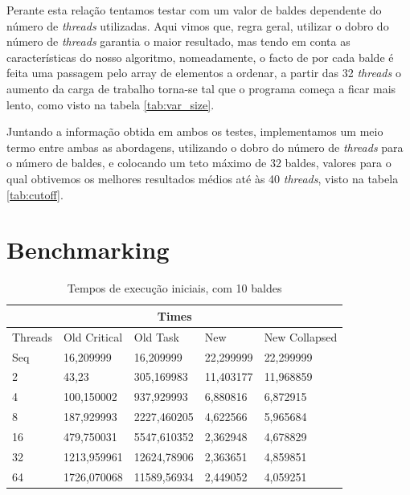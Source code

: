 \documentclass[a4paper]{report}
\begin{document}
Perante esta relação tentamos testar com um valor de baldes dependente do número
de \textit{threads} utilizadas. Aqui vimos que, regra geral, utilizar o dobro do
número de \textit{threads} garantia o maior resultado, mas tendo em conta as
características do nosso algoritmo, nomeadamente, o facto de por cada balde é
feita uma passagem pelo array de elementos a ordenar, a partir das 32
\textit{threads} o aumento da carga de trabalho torna-se tal que o programa
começa a ficar mais lento, como visto na tabela \ref{tab:var_size}.

Juntando a informação obtida em ambos os testes, implementamos um meio termo
entre ambas as abordagens, utilizando o dobro do número de \textit{threads} para
o número de baldes, e colocando um teto máximo de 32 baldes, valores para o qual
obtivemos os melhores resultados médios até às 40 \textit{threads}, visto na
tabela \ref{tab:cutoff}.

\appendix

\chapter{Benchmarking}
\begin{table}[h]
    \centering
    \begin{tabular}{|l|l|l|l|l|}
        \hline
        \multicolumn{5}{|c|}{Times}                                      \\ \hline
        Threads & Old Critical & Old Task    & New       & New Collapsed \\ \hline
        Seq     & 16,209999    & 16,209999   & 22,299999 & 22,299999     \\ \hline
        2       & 43,23        & 305,169983  & 11,403177 & 11,968859     \\ \hline
        4       & 100,150002   & 937,929993  & 6,880816  & 6,872915      \\ \hline
        8       & 187,929993   & 2227,460205 & 4,622566  & 5,965684      \\ \hline
        16      & 479,750031   & 5547,610352 & 2,362948  & 4,678829      \\ \hline
        32      & 1213,959961  & 12624,78906 & 2,363651  & 4,859851      \\ \hline
        64      & 1726,070068  & 11589,56934 & 2,449052  & 4,059251      \\ \hline
    \end{tabular}
    \caption{\label{tab:Times}Tempos de execução iniciais, com 10 baldes}
\end{table}
\end{document}
